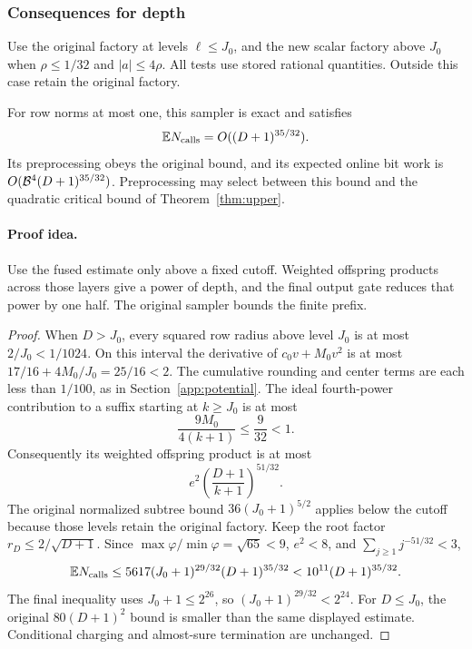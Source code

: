 \subsubsection{Consequences for depth}

Use the original factory at levels \(\ell\le J_0\), and the
new scalar factory above \(J_0\) when \(\rho\le1/32\) and
\(|a|\le4\rho\).  All tests use stored rational quantities.
Outside this case retain the original factory.

\begin{theorem}\label{thm:fusedcritical}%
\label{thm:criticalrefined}
For row norms at most one, this sampler is exact and satisfies
\[
 \mathbb E N_{\rm calls}=O((D+1)^{35/32}).
\]
Its preprocessing obeys the original bound, and its expected
online bit work is \(O(\mathcal B^4(D+1)^{35/32})\).
Preprocessing may select between this bound and the quadratic
critical bound of Theorem~\ref{thm:upper}.
\end{theorem}
\paragraph{Proof idea.}
Use the fused estimate only above a fixed cutoff. Weighted offspring
products across those layers give a power of depth, and the final output
gate reduces that power by one half. The original sampler bounds the finite
prefix.

\begin{proof}
When \(D>J_0\), every squared row radius above level \(J_0\)
is at most \(2/J_0<1/1024\).  On this interval the derivative
of \(c_0v+M_0v^2\) is at most
\(17/16+4M_0/J_0=25/16<2\).
The cumulative rounding and center terms are each less than
\(1/100\), as in Section~\ref{app:potential}.
The ideal fourth-power contribution to a suffix starting at
\(k\ge J_0\) is at most
\[
 \frac{9M_0}{4(k+1)}\le\frac9{32}<1.
\]
Consequently its weighted offspring product is at most
\[
 e^2\left(\frac{D+1}{k+1}\right)^{51/32}.
\]
The original normalized subtree bound
\(36(J_0+1)^{5/2}\) applies below the cutoff because those
levels retain the original factory.  Keep the root factor
\(r_D\le2/\sqrt{D+1}\).  Since
\(\max\varphi/\min\varphi=\sqrt{65}<9\),
\(e^2<8\), and \(\sum_{j\ge1}j^{-51/32}<3\),
\[
 \mathbb E N_{\rm calls}
 \le5617(J_0+1)^{29/32}(D+1)^{35/32}
 <10^{11}(D+1)^{35/32}.
\]
The final inequality uses \(J_0+1\le2^{26}\), so
\((J_0+1)^{29/32}<2^{24}\).
For \(D\le J_0\), the original \(80(D+1)^2\) bound is
smaller than the same displayed estimate.
Conditional charging and almost-sure termination are unchanged.
\end{proof}

